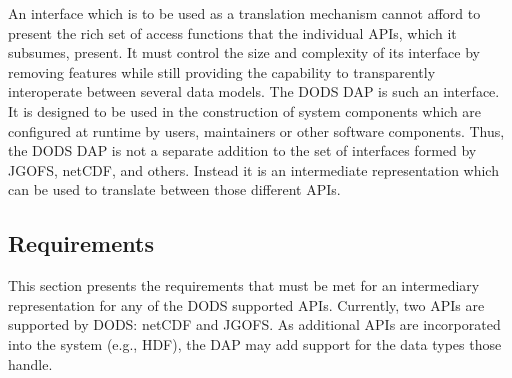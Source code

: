 An interface which is to be used as a translation mechanism cannot
afford to present the rich set of access functions that the individual
APIs, which it subsumes, present. It must control the size and
complexity of its interface by removing features while still providing
the capability to transparently interoperate between several data
models. The DODS DAP is such an interface.  It is designed to be used
in the construction of system components which are configured at
runtime by users, maintainers or other software components.  Thus, the
DODS DAP is not a separate addition to the set of interfaces formed by
JGOFS, netCDF, and others.  Instead it is an intermediate
representation which can be used to translate between those different
APIs.

\subsection{Requirements}

This section presents the requirements that must be met for an intermediary
representation for any of the DODS supported APIs. Currently, two APIs are
supported by DODS: netCDF and JGOFS\@. As additional APIs are incorporated
into the system (e.g., HDF), the DAP may add support for the data types those
handle.

